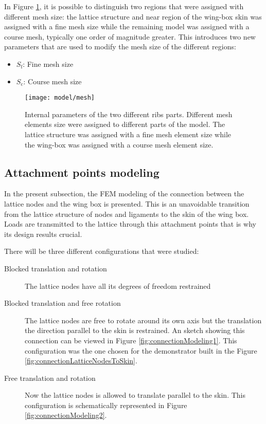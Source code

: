     In Figure \ref{fig:mesh}, it is possible to distinguish two regions that were assigned with different mesh size: the lattice structure and near region of the wing-box skin was assigned with a fine mesh size while the remaining model was assigned with a course mesh, typically one order of magnitude greater. This introduces two new parameters that are used to modify the mesh size of the different regions:

    \begin{itemize}
      \item $S_{\mathrm{f}}$: Fine mesh size
      \item $S_{\mathrm{c}}$: Course mesh size
    \end{itemize}

    \begin{figure}[!htpb]
      \centering
      \texttt{[image: model/mesh]}
      \caption[Internal parameters of the two different ribs parts]{Internal parameters of the two different ribs parts. Different mesh elements size were assigned to different parts of the model. The lattice structure was assigned with a fine mesh element size while the wing-box was assigned with a course mesh element size.}\label{fig:mesh}
    \end{figure}

  \clearpage
  \subsection{Attachment points modeling} \label{subsec:connections_computationalModel}

    In the present subsection, the FEM modeling of the connection between the lattice nodes and the wing box is presented. This is an unavoidable transition from the lattice structure of nodes and ligaments to the skin of the wing box. Loads are transmitted to the lattice through this attachment points that is why its design results crucial.

    There will be three different configurations that were studied:

    \begin{description}
      \item[Blocked translation and rotation] The lattice nodes have all its degrees of freedom restrained
      \item[Blocked translation and free rotation] The lattice nodes are free to rotate around its own axis but the translation the direction parallel to the skin is restrained. An sketch showing this connection can be viewed in Figure \ref{fig:connectionModeling1}. This configuration was the one chosen for the demonstrator built in the Figure \ref{fig:connectionLatticeNodesToSkin}.
      \item[Free translation and rotation] Now the lattice nodes is allowed to translate parallel to the skin. This configuration is schematically represented in Figure \ref{fig:connectionModeling2}.
    \end{description}

